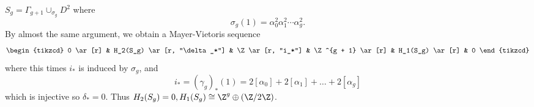 \documentclass[a4paper]{article}
\begin{document}
\begin{eg}
  \(S_g = \Gamma_{g + 1} \cup_{\sigma_g} D^2\) where
  \[
    \sigma_g(1) = \alpha_0^2 \alpha_1^2 \cdots \alpha_g^2.
  \]
  By almost the same argument, we obtain a Mayer-Vietoris sequence
  \[
    \begin{tikzcd}
      0 \ar[r] & H_2(S_g) \ar[r, "\delta_*"] & \Z \ar[r, "i_*"] & \Z^{g + 1} \ar[r] & H_1(S_g) \ar[r] & 0
    \end{tikzcd}
  \]
  where this times \(i_*\) is induced by \(\sigma_g\), and
  \[
    i_*
    = (\gamma_g)_*(1) = 2[\alpha_0] + 2[\alpha_1] + \dots + 2[\alpha_g]
  \]
  which is injective so \(\delta_* = 0\). Thus \(H_2(S_g) = 0, H_1(S_g) \cong \Z^g \oplus (\Z/2\Z)\).
\end{eg}











\printindex
\end{document}
